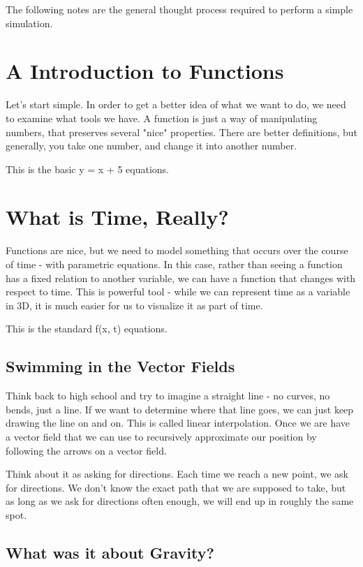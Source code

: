 \documentclass[11pt]{article} %
\begin{document}
The following notes are the general thought process required to perform a simple simulation. 

\section{A Introduction to Functions}
Let's start simple. In order to get a better idea of what we want to do, we need to examine what tools we have. A function is just a way of manipulating numbers, that preserves several "nice" properties. There are better definitions, but generally, you take one number, and change it into another number.

This is the basic y = x + 5 equations.

\section{What is Time, Really?}

Functions are nice, but we need to model something that occurs over the course of time - with parametric equations. In this case, rather than seeing a function has a fixed relation to another variable, we can have a function that changes with respect to time. This is powerful tool - while we can represent time as a variable in 3D, it is much easier for us to visualize it as part of time.

This is the standard f(x, t) equations.

\subsection{Swimming in the Vector Fields}

Think back to high school and try to imagine a straight line - no curves, no bends, just a line. If we want to determine where that line goes, we can just keep drawing the line on and on. This is called linear interpolation. Once we are have a vector field that we can use to recursively approximate our position by following the arrows on a vector field.

Think about it as asking for directions. Each time we reach a new point, we ask for directions. We don't know the exact path that we are supposed to take, but as long as we ask for directions often enough, we will end up in roughly the same spot.

\subsection{What was it about Gravity?}
\end{document}
